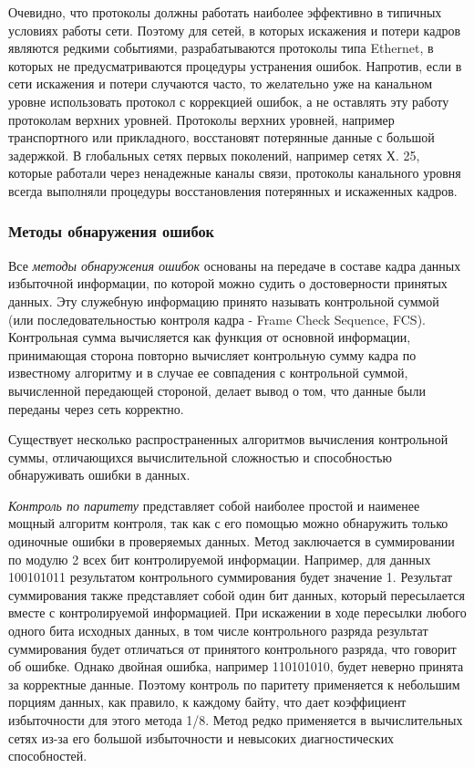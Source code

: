 Очевидно, что протоколы должны работать наиболее эффективно в типичных условиях работы сети.
Поэтому для сетей, в которых искажения и потери кадров являются редкими событиями, разрабатываются протоколы типа Ethernet, в которых не предусматриваются процедуры устранения ошибок.
Напротив, если в сети искажения и потери случаются часто, то желательно уже на канальном уровне использовать протокол с коррекцией ошибок, а не оставлять эту работу протоколам верхних уровней.
Протоколы верхних уровней, например транспортного или прикладного, восстановят потерянные данные с большой задержкой.
В глобальных сетях первых поколений, например сетях Х.
25, которые работали через ненадежные каналы связи, протоколы канального уровня всегда выполняли процедуры восстановления потерянных и искаженных кадров.

\subsubsection{Методы обнаружения ошибок}

Все \emph{методы обнаружения ошибок} основаны на передаче в составе кадра данных избыточной информации, по которой можно судить о достоверности принятых данных.
Эту служебную информацию принято называть контрольной суммой (или последовательностью контроля кадра - Frame Check Sequence, FCS).
Контрольная сумма вычисляется как функция от основной информации, принимающая сторона повторно вычисляет контрольную сумму кадра по известному алгоритму и в случае ее совпадения с контрольной суммой, вычисленной передающей стороной, делает вывод о том, что данные были переданы через сеть корректно.

Существует несколько распространенных алгоритмов вычисления контрольной суммы, отличающихся вычислительной сложностью и способностью обнаруживать ошибки в данных.

\emph{Контроль по паритету} представляет собой наиболее простой и наименее мощный алгоритм контроля, так как с его помощью можно обнаружить только одиночные ошибки в проверяемых данных.
Метод заключается в суммировании по модулю 2 всех бит контролируемой информации.
Например, для данных 100101011 результатом контрольного суммирования будет значение 1.
Результат суммирования также представляет собой один бит данных, который пересылается вместе с контролируемой информацией.
При искажении в ходе пересылки любого одного бита исходных данных, в том числе контрольного разряда результат суммирования будет отличаться от принятого контрольного разряда, что говорит об ошибке.
Однако двойная ошибка, например 110101010, будет неверно принята за корректные данные.
Поэтому контроль по паритету применяется к небольшим порциям данных, как правило, к каждому байту, что дает коэффициент избыточности для этого метода 1/8.
Метод редко применяется в вычислительных сетях из-за его большой избыточности и невысоких диагностических способностей.

